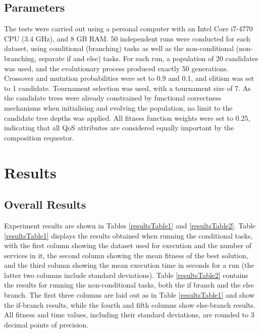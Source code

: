 \documentclass[conference]{IEEEtran}
\begin{document}
\subsection{Parameters}
The tests were carried out using a personal computer with an Intel Core i7-4770 CPU (3.4 GHz), and 8 GB RAM. 50 independent runs were conducted for each dataset, using conditional (branching) tasks as well as the non-conditional (non-branching, separate if and else) tasks. For each run, a population of 20 candidates was used, and the evolutionary process produced exactly 50 generations. Crossover and mutation probabilities were set to 0.9 and 0.1, and elitism was set to 1 candidate. Tournament selection was used, with a tournament size of 7. As the candidate trees were already constrained by functional correctness mechanisms when initialising and evolving the population, no limit to the candidate tree depths was applied. All fitness function weights were set to 0.25, indicating that all QoS attributes are considered equally important by the composition requestor.

\section{Results}\label{results}

\subsection{Overall Results}

Experiment results are shown in Tables \ref{resultsTable1} and \ref{resultsTable2}. Table \ref{resultsTable1} displays the results obtained when running the conditional tasks, with the first column showing the dataset used for execution and the number of services in it, the second column showing the mean fitness of the best solution, and the third column showing the mean execution time in seconds for a run (the latter two columns include standard deviations). Table \ref{resultsTable2} contains the results for running the non-conditional tasks, both the if branch and the else branch. The first three columns are laid out as in Table \ref{resultsTable1} and show the if-branch results, while the fourth and fifth columns show else-branch results. All fitness and time values, including their standard deviations, are rounded to 3 decimal points of precision.
\end{document}
